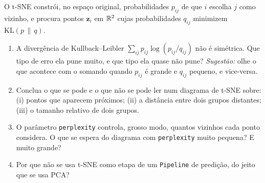 \documentclass[11pt,a4paper]{article}
\begin{document}
\begin{exercicio}
O t-SNE constrói, no espaço original, probabilidades $p_{ij}$ de que $i$ escolha
$j$ como vizinho, e procura pontos $\bm z_i$ em $\mathbb{R}^2$ cujas probabilidades
$q_{ij}$ minimizem $\mathrm{KL}(p\,\|\,q)$.
\begin{enumerate}[label=(\alph*),leftmargin=1.1cm]
  \item A divergência de Kullback--Leibler $\sum_{ij} p_{ij}\log(p_{ij}/q_{ij})$
        não é simétrica. Que tipo de erro ela pune muito, e que tipo ela quase
        não pune? \emph{Sugestão:} olhe o que acontece com o somando quando
        $p_{ij}$ é grande e $q_{ij}$ pequeno, e vice-versa.
  \item Conclua o que se pode e o que não se pode ler num diagrama de t-SNE
        sobre: (i) pontos que aparecem próximos; (ii) a distância entre dois
        grupos distantes; (iii) o tamanho relativo de dois grupos.
  \item O parâmetro \texttt{perplexity} controla, grosso modo, quantos vizinhos
        cada ponto considera. O que se espera do diagrama com
        \texttt{perplexity} muito pequena? E muito grande?
  \item Por que não se usa t-SNE como etapa de um \texttt{Pipeline} de predição,
        do jeito que se usa PCA?
\end{enumerate}
\end{exercicio}
\end{document}
